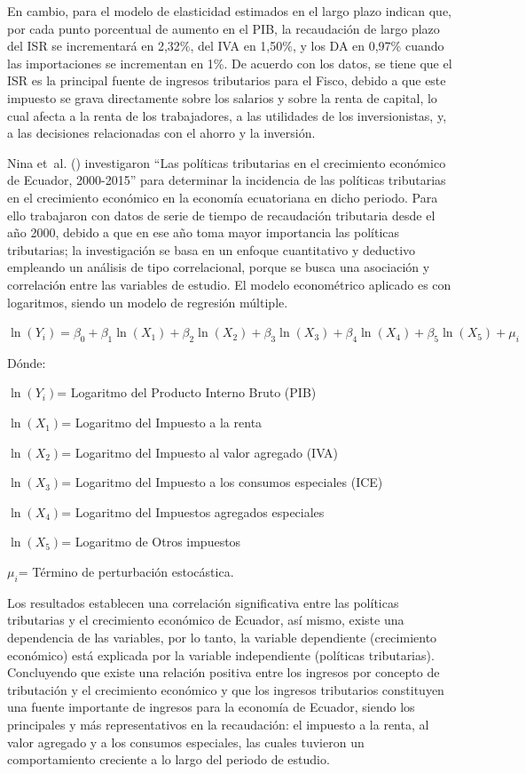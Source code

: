 \documentclass[
  jou,
  floatsintext,
  longtable,
  a4paper,
  nolmodern,
  notxfonts,
  notimes,
  12pt,
  colorlinks=true,linkcolor=blue,citecolor=blue,urlcolor=blue]{apa7}
\begin{document}
En cambio, para el modelo de elasticidad estimados en el largo plazo
indican que, por cada punto porcentual de aumento en el PIB, la
recaudación de largo plazo del ISR se incrementará en 2,32\%, del IVA en
1,50\%, y los DA en 0,97\% cuando las importaciones se incrementan en
1\%. De acuerdo con los datos, se tiene que el ISR es la principal
fuente de ingresos tributarios para el Fisco, debido a que este impuesto
se grava directamente sobre los salarios y sobre la renta de capital, lo
cual afecta a la renta de los trabajadores, a las utilidades de los
inversionistas, y, a las decisiones relacionadas con el ahorro y la
inversión.

Nina et~al. () investigaron
``Las políticas tributarias en el crecimiento económico de Ecuador,
2000-2015'' para determinar la incidencia de las políticas tributarias
en el crecimiento económico en la economía ecuatoriana en dicho periodo.
Para ello trabajaron con datos de serie de tiempo de recaudación
tributaria desde el año 2000, debido a que en ese año toma mayor
importancia las políticas tributarias; la investigación se basa en un
enfoque cuantitativo y deductivo empleando un análisis de tipo
correlacional, porque se busca una asociación y correlación entre las
variables de estudio. El modelo econométrico aplicado es con logaritmos,
siendo un modelo de regresión múltiple.

\(\ln(Y_i) = \beta_{0} + \beta_{1}\ln(X_1) + \beta_{2}\ln(X_2) + \beta_{3}\ln(X_3) + \beta_{4}\ln(X_4) + \beta_{5}\ln(X_5) + \mu_{i}\)

Dónde:

\(\ln(Y_i)\)= Logaritmo del Producto Interno Bruto (PIB)

\(\ln(X_1)\)= Logaritmo del Impuesto a la renta

\(\ln(X_2)\)= Logaritmo del Impuesto al valor agregado (IVA)

\(\ln(X_3)\)= Logaritmo del Impuesto a los consumos especiales (ICE)

\(\ln(X_4)\)= Logaritmo del Impuestos agregados especiales

\(\ln(X_5)\)= Logaritmo de Otros impuestos

\(\mu_{i}\)= Término de perturbación estocástica.

Los resultados establecen una correlación significativa entre las
políticas tributarias y el crecimiento económico de Ecuador, así mismo,
existe una dependencia de las variables, por lo tanto, la variable
dependiente (crecimiento económico) está explicada por la variable
independiente (políticas tributarias). Concluyendo que existe una
relación positiva entre los ingresos por concepto de tributación y el
crecimiento económico y que los ingresos tributarios constituyen una
fuente importante de ingresos para la economía de Ecuador, siendo los
principales y más representativos en la recaudación: el impuesto a la
renta, al valor agregado y a los consumos especiales, las cuales
tuvieron un comportamiento creciente a lo largo del periodo de estudio.
\end{document}
